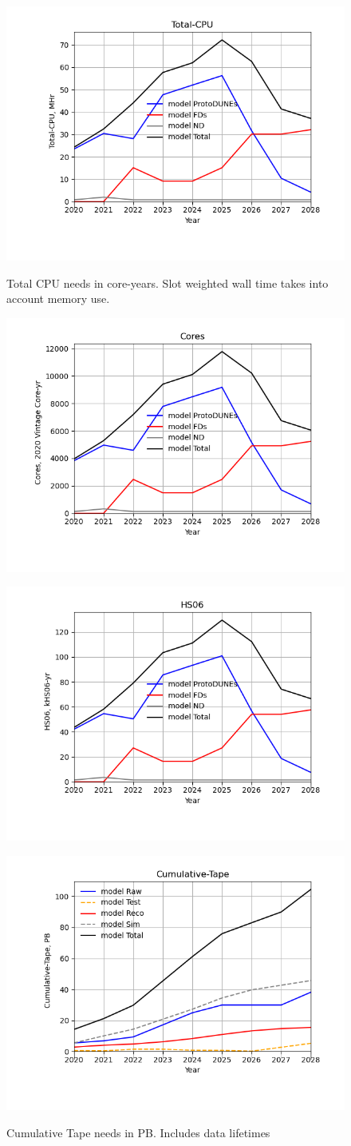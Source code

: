 \documentclass[12pt,landscape]{article}
\begin{document}
\begin{figure}[ht]
\centering\includegraphics[height=0.4\textwidth]{report/Parameters_2022-11-07-2028-Total-CPU.png}\label{Total-CPU}
\caption{Total CPU needs in core-years. Slot weighted wall time takes into account memory use.}
\end{figure}
\begin{figure}[ht]
\centering\includegraphics[height=0.4\textwidth]{report/Parameters_2022-11-07-2028-Cores.png}\label{Cores}
\caption{}
\end{figure}
\begin{figure}[ht]
\centering\includegraphics[height=0.4\textwidth]{report/Parameters_2022-11-07-2028-HS06.png}\label{HS06}
\caption{}
\end{figure}
\begin{figure}[ht]
\centering\includegraphics[height=0.4\textwidth]{report/Parameters_2022-11-07-2028-Cumulative-Tape.png}\label{Cumulative-Tape}
\caption{Cumulative Tape needs in PB. Includes data lifetimes}
\end{figure}
\end{document}
